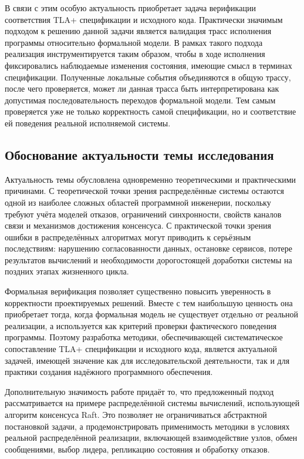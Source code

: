 В связи с этим особую актуальность приобретает задача верификации
соответствия TLA+ спецификации и исходного кода. Практически значимым
подходом к решению данной задачи является валидация трасс исполнения
программы относительно формальной модели. В рамках такого подхода
реализация инструментируется таким образом, чтобы в ходе исполнения
фиксировались наблюдаемые изменения состояния, имеющие смысл в
терминах спецификации. Полученные локальные события объединяются в
общую трассу, после чего проверяется, может ли данная трасса быть
интерпретирована как допустимая последовательность переходов формальной
модели. Тем самым проверяется уже не только корректность самой
спецификации, но и соответствие ей поведения реальной исполняемой
системы.

\subsection*{Обоснование актуальности темы исследования}

Актуальность темы обусловлена одновременно теоретическими и
практическими причинами. С теоретической точки зрения распределённые
системы остаются одной из наиболее сложных областей программной
инженерии, поскольку требуют учёта моделей отказов, ограничений
синхронности, свойств каналов связи и механизмов достижения консенсуса.
С практической точки зрения ошибки в распределённых алгоритмах могут
приводить к серьёзным последствиям: нарушению согласованности данных,
остановке сервисов, потере результатов вычислений и необходимости
дорогостоящей доработки системы на поздних этапах жизненного цикла.

Формальная верификация позволяет существенно повысить уверенность в
корректности проектируемых решений. Вместе с тем наибольшую ценность
она приобретает тогда, когда формальная модель не существует отдельно от
реальной реализации, а используется как критерий проверки фактического
поведения программы. Поэтому разработка методики, обеспечивающей
систематическое сопоставление TLA+ спецификации и исходного кода,
является актуальной задачей, имеющей значение как для исследовательской
деятельности, так и для практики создания надёжного программного
обеспечения.

Дополнительную значимость работе придаёт то, что предложенный подход
рассматривается на примере распределённой системы вычислений,
использующей алгоритм консенсуса Raft. Это позволяет не ограничиваться
абстрактной постановкой задачи, а продемонстрировать применимость
методики в условиях реальной распределённой реализации, включающей
взаимодействие узлов, обмен сообщениями, выбор лидера, репликацию
состояния и обработку отказов.

